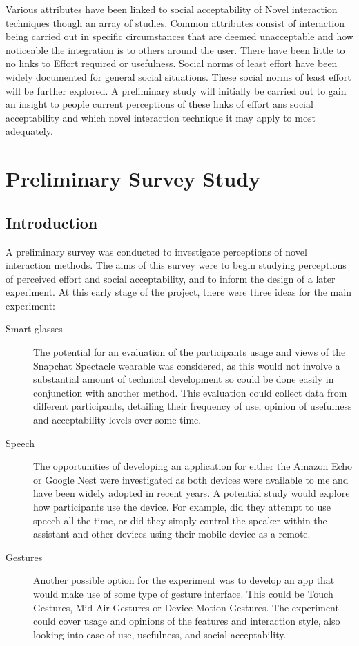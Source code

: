 \documentclass{l4proj}
\begin{document}
Various attributes have been linked to social acceptability of Novel interaction techniques though an array of studies. Common attributes consist of interaction being carried out in specific circumstances that are deemed unacceptable and how noticeable the integration is to others around the user. There have been little to no links to Effort required or usefulness. Social norms of least effort have been widely documented for general social situations. These social norms of least effort will be further explored. A preliminary study will initially be carried out to gain an insight to people current perceptions of these links of effort ans social acceptability and which novel interaction technique it may apply to most adequately.

\chapter{Preliminary Survey Study}

\section{Introduction}

A preliminary survey was conducted to investigate perceptions of novel interaction methods. The aims of this survey were to begin studying perceptions of perceived effort and social acceptability, and to inform the design of a later experiment. At this early stage of the project, there were three ideas for the main experiment:

\begin{description}
    \item[Smart-glasses] The potential for an evaluation of the participants usage and views of the Snapchat Spectacle wearable was considered, as this would not involve a substantial amount of technical development so could be done easily in conjunction with another method. This evaluation could collect data from different participants, detailing their frequency of use, opinion of usefulness and acceptability levels over some time. 

    \item[Speech] The opportunities of developing an application for either the Amazon Echo or Google Nest were investigated as both devices were available to me and have been widely adopted in recent years. A potential study would explore how participants use the device. For example, did they attempt to use speech all the time, or did they simply control the speaker within the assistant and other devices using their mobile device as a remote. 

    \item[Gestures] Another possible option for the experiment was to develop an app that would make use of some type of gesture interface. This could be Touch Gestures, Mid-Air Gestures or Device Motion Gestures. The experiment could cover usage and opinions of the features and interaction style, also looking into ease of use, usefulness, and social acceptability.
\end{description}
\end{document}
